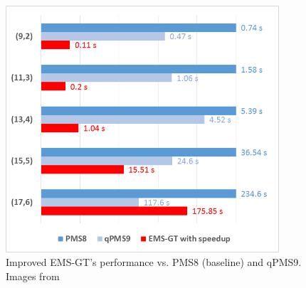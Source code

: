 
\begin{figure}[ht]\label{fig:results2}
	\centering
	\includegraphics[width=4.0in]{contents/00_images/emsgt-with-speedup-vs-PMS,qPMS9}
	\caption{Improved EMS-GT's performance vs. PMS8 (baseline) and qPMS9. Images from \cite{sia2015}}
	\label{fig:sia-bar-results}
\end{figure}